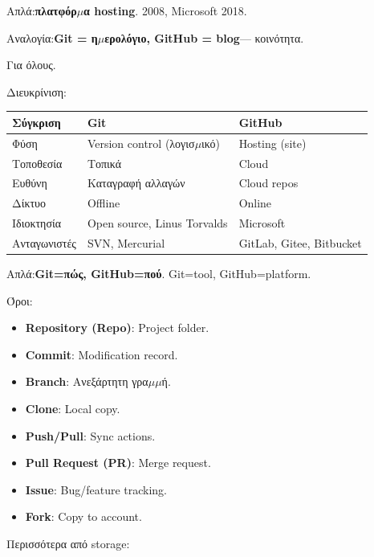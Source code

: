 


Απλά:\textbf{πλατφόρ$\mu$α hosting}. 2008, Microsoft 2018.

Αναλογία:\textbf{Git = η$\mu$ερολόγιο, GitHub = blog}— κοινότητα.

Για όλους.


Διευκρίνιση:

\begin{center}
\begin{tabularx}{\linewidth}{|X|X|X|}
\hline
\textbf{Σύγκριση} & \textbf{Git} & \textbf{GitHub} \tabularnewline
\hline
Φύση & Version control (λογισ$\mu$ικό) & Hosting (site) \tabularnewline
Τοποθεσία & Τοπικά & Cloud \tabularnewline
Ευθύνη & Καταγραφή αλλαγών & Cloud repos \tabularnewline
Δίκτυο & Offline & Online \tabularnewline
Ιδιοκτησία & Open source, Linus Torvalds & Microsoft \tabularnewline
Ανταγωνιστές & SVN, Mercurial & GitLab, Gitee, Bitbucket \tabularnewline
\hline
\end{tabularx}
\end{center}

Απλά:\textbf{Git=πώς, GitHub=πού}. Git=tool, GitHub=platform.



Όροι:

\begin{itemize}
  \item \textbf{Repository (Repo)}: Project folder.
  \item \textbf{Commit}: Modification record.
  \item \textbf{Branch}: Ανεξάρτητη γρα$\mu$$\mu$ή.
  \item \textbf{Clone}: Local copy.
  \item \textbf{Push/Pull}: Sync actions.
  \item \textbf{Pull Request (PR)}: Merge request.
  \item \textbf{Issue}: Bug/feature tracking.
  \item \textbf{Fork}: Copy to account.
\end{itemize}


Περισσότερα από storage:

